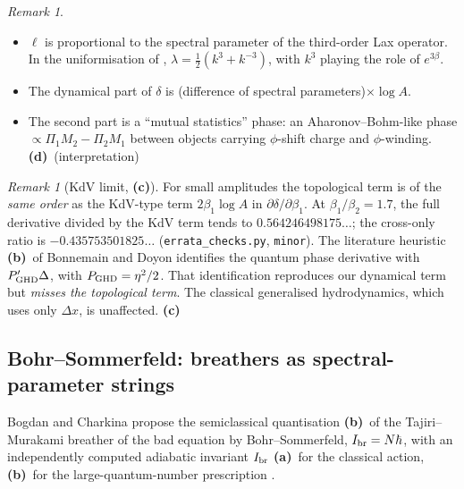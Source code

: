 \documentclass[11pt,a4paper]{article}
\newcommand{\La}{\textsf{\textbf{(a)}}\xspace}
\newcommand{\Lb}{\textsf{\textbf{(b)}}\xspace}
\newcommand{\Lc}{\textsf{\textbf{(c)}}\xspace}
\newcommand{\Ld}{\textsf{\textbf{(d)}}\xspace}
\newcommand{\file}[1]{\nolinkurl{#1}}
\theoremstyle{remark}\newtheorem{remark}[proposition]{Remark}
\begin{document}
\begin{remark}
\begin{itemize}
\item $\ell$ is proportional to the spectral parameter of the third-order Lax operator. In the uniformisation of \cite{CL-WW}, $\lambda=\tfrac12(k^3+k^{-3})$, with $k^3$ playing the role of $e^{3\beta}$.
\item The dynamical part of $\delta$ is (difference of spectral parameters)$\times\log A$.
\item The second part is a ``mutual statistics'' phase: an Aharonov--Bohm-like phase $\propto\Pi_1M_2-\Pi_2M_1$ between objects carrying $\phi$-shift charge and $\phi$-winding. \Ld\ (interpretation)
\end{itemize}
\end{remark}

\begin{remark}[KdV limit, \Lc]
For small amplitudes the topological term is of the \emph{same order} as the KdV-type term $2\beta_1\log A$ in $\partial\delta/\partial\beta_1$. At $\beta_1/\beta_2=1.7$, the full derivative divided by the KdV term tends to $0.564246498175\ldots$; the cross-only ratio is $-0.435753501825\ldots$ (\file{errata_checks.py}, \file{minor}). The literature heuristic \Lb\ of Bonnemain and Doyon \cite{BD} identifies the quantum phase derivative with $P'_{\rm GHD}\Delta$, with $P_{\rm GHD}=\eta^2/2$. That identification reproduces our dynamical term but \emph{misses the topological term}. The classical generalised hydrodynamics, which uses only $\Delta x$, is unaffected. \Lc
\end{remark}

\subsection{Bohr--Sommerfeld: breathers as spectral-parameter strings}

Bogdan and Charkina propose the semiclassical quantisation \Lb\ of the Tajiri--Murakami breather of the bad equation by Bohr--Sommerfeld, $I_{\rm br}=N\hbar$, with an independently computed adiabatic invariant $I_{\rm br}$ \La\ for the classical action, \Lb\ for the large-quantum-number prescription \cite[(64)--(65)]{BC}.
\end{document}
